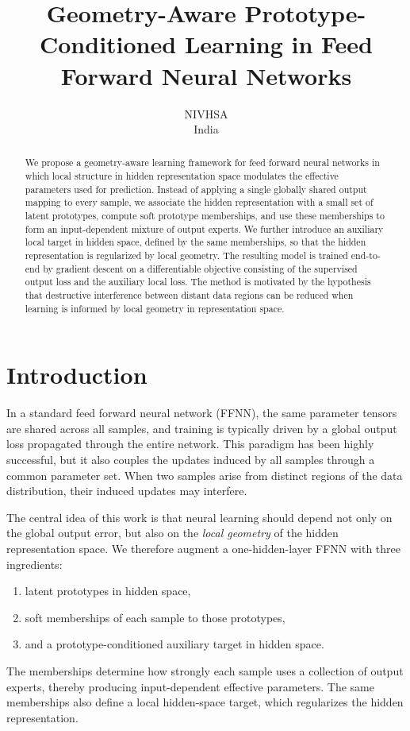 \documentclass{article}
\title{Geometry-Aware Prototype-Conditioned Learning in Feed Forward Neural Networks}
\author{NIVHSA\\
  \small India}
\theoremstyle{definition}
\theoremstyle{remark}
\begin{document}
\maketitle

\begin{abstract}
We propose a geometry-aware learning framework for feed forward neural networks in which local structure in hidden representation space modulates the effective parameters used for prediction. Instead of applying a single globally shared output mapping to every sample, we associate the hidden representation with a small set of latent prototypes, compute soft prototype memberships, and use these memberships to form an input-dependent mixture of output experts. We further introduce an auxiliary local target in hidden space, defined by the same memberships, so that the hidden representation is regularized by local geometry. The resulting model is trained end-to-end by gradient descent on a differentiable objective consisting of the supervised output loss and the auxiliary local loss. The method is motivated by the hypothesis that destructive interference between distant data regions can be reduced when learning is informed by local geometry in representation space.
\end{abstract}

\section{Introduction}

In a standard feed forward neural network (FFNN), the same parameter tensors are shared across all samples, and training is typically driven by a global output loss propagated through the entire network. This paradigm has been highly successful, but it also couples the updates induced by all samples through a common parameter set. When two samples arise from distinct regions of the data distribution, their induced updates may interfere.

The central idea of this work is that neural learning should depend not only on the global output error, but also on the \emph{local geometry} of the hidden representation space. We therefore augment a one-hidden-layer FFNN with three ingredients:
\begin{enumerate}
    \item latent prototypes in hidden space,
    \item soft memberships of each sample to those prototypes,
    \item and a prototype-conditioned auxiliary target in hidden space.
\end{enumerate}
The memberships determine how strongly each sample uses a collection of output experts, thereby producing input-dependent effective parameters. The same memberships also define a local hidden-space target, which regularizes the hidden representation.
\end{document}
